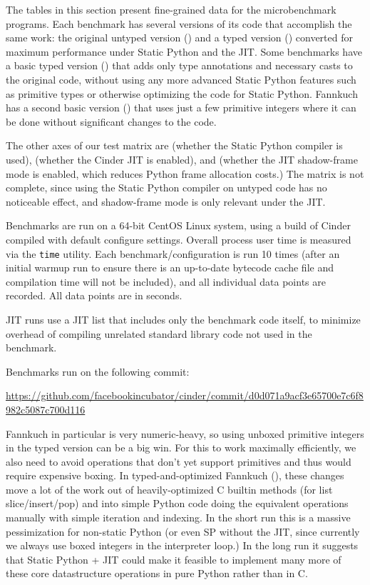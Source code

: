\documentclass[english,cleveref,submission]{programming}
\newcommand{\code}[1]{\texttt{#1}}
\begin{document}
The tables in this section present fine-grained data for the microbenchmark programs.
Each benchmark has several versions of its code that accomplish the same work:
the original untyped version () and a typed version () converted for maximum
performance under Static Python and the JIT.
Some benchmarks have a basic typed version () that adds only
type annotations and necessary casts to the original code,
without using any more advanced Static Python
features such as primitive types or otherwise optimizing the code for Static
Python.
Fannkuch has a second basic version () that uses just a few primitive integers
where it can be done without significant changes to the code.

The other axes of our test matrix are  (whether the Static Python compiler is
used),  (whether the Cinder JIT is enabled), and  (whether the JIT
shadow-frame mode is enabled, which reduces Python frame allocation costs.) The
matrix is not complete, since using the Static Python compiler on untyped code
has no noticeable effect, and shadow-frame mode is only relevant under the JIT.

Benchmarks are run on a 64-bit CentOS Linux system, using a build of Cinder
compiled with default configure settings. Overall process user time is measured
via the \code{time} utility. Each benchmark/configuration is run 10 times (after an
initial warmup run to ensure there is an up-to-date bytecode cache file and
compilation time will not be included), and all individual data points are
recorded. All data points are in seconds.

JIT runs use a JIT list that includes only the benchmark code itself, to
minimize overhead of compiling unrelated standard library code not used in the
benchmark.

Benchmarks run on the following commit:

\smallskip
{\centering\footnotesize\url{https://github.com/facebookincubator/cinder/commit/d0d071a9acf3e65700e7c6f8982c5087c700d116}}

Fannkuch in particular is very numeric-heavy, so using unboxed primitive
integers in the typed version can be a big win. For this to work maximally
efficiently, we also need to avoid operations that don't yet support primitives
and thus would require expensive boxing. In typed-and-optimized Fannkuch (), these changes move
a lot of the work out of heavily-optimized C builtin methods (for list
slice/insert/pop) and into simple Python code doing the equivalent operations
manually with simple iteration and indexing. In the short run this is a massive
pessimization for non-static Python (or even SP without the JIT, since
currently we always use boxed integers in the interpreter loop.) In the long
run it suggests that Static Python + JIT could make it feasible to implement
many more of these core datastructure operations in pure Python rather than in
C.
\end{document}
